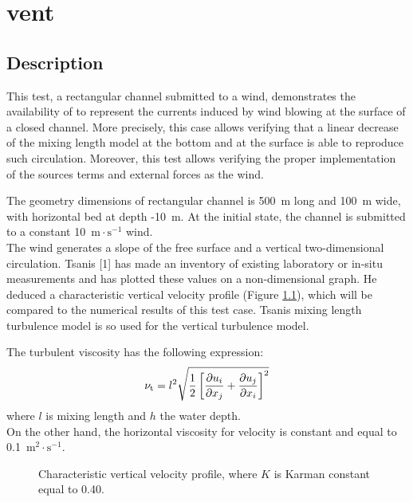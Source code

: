 \chapter{vent}

\section{Description}
%
\bigskip
This test, a rectangular channel submitted to a wind,
demonstrates the availability of  to represent the currents
induced by wind blowing at the surface of a closed channel.
More precisely, this case allows verifying that a linear decrease of the mixing
length model at the bottom and at the surface is able to reproduce such circulation.
Moreover, this test allows verifying the proper implementation of the sources terms
and external forces as the wind.

\bigskip
The geometry dimensions of rectangular channel is 500~m long and 100~m wide,
 with horizontal bed at depth -10~m. At the initial state, the channel is submitted
 to a constant 10~$\text{m}\cdot\text{s}^{-1}$ wind. \\
The wind generates a slope of the free surface and a vertical two-dimensional circulation.
Tsanis [1] has made an inventory of existing laboratory or in-situ
measurements and has plotted these values on a non-dimensional graph.
He deduced a characteristic vertical velocity profile
(Figure \ref{t3d:vent:fig:mixinglength}), which will be compared to
the numerical results of this test case.
Tsanis mixing length turbulence model is so used for the vertical turbulence model.

The turbulent viscosity has the following expression:
\begin{equation*}
\nu_{\rm{t}} = l^2 \sqrt{\frac{1}{2}\left[ \frac{\partial u_i}{\partial x_j}
 + \frac{\partial u_j}{\partial x_i} \right]^2}
\end{equation*}
where $l$ is mixing length and $h$ the water depth.\\
On the other hand, the horizontal viscosity for velocity is constant and equal
to 0.1~$\text{m}^2\cdot\text{s}^{-1}$.

\begin{figure}[!htbp]
 \centering
 \caption{Characteristic vertical velocity profile,
 where $K$ is Karman constant equal to 0.40.}
 \label{t3d:vent:fig:mixinglength}
\end{figure}

